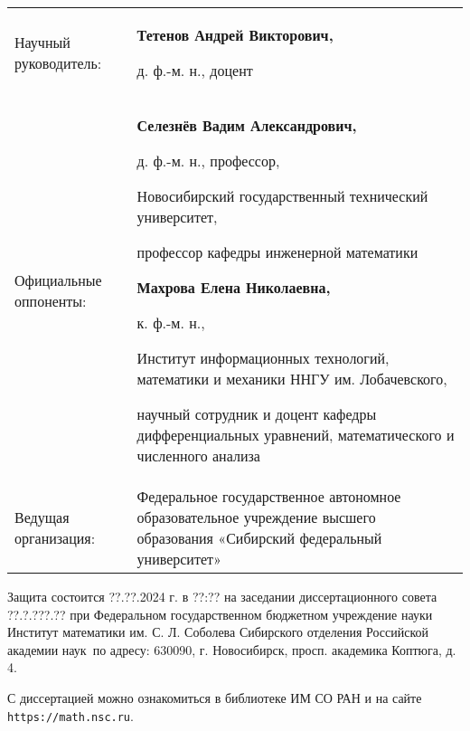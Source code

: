 \documentclass[a5paper,9pt,twoside]{extarticle} %
\begin{document}
\vspace{0.008\paperheight plus1fill}
\noindent%
\begin{tabular}{p{} p{}}
Научный руководитель: & \textbf{Тетенов Андрей Викторович,}\par
д. ф.-м. н., доцент

\vspace{0.013\paperheight}\\
Официальные оппоненты: &
{%
\textbf{Селезнёв Вадим Александрович,}\par
д. ф.-м. н., профессор,\par
Новосибирский государственный технический университет,\par
профессор кафедры инженерной математики\par
\vspace{0.01\paperheight}
\textbf{Махрова Елена Николаевна,}\par
к. ф.-м. н.,\par
Институт информационных технологий, математики и механики ННГУ им. Лобачевского,\par
научный сотрудник и доцент кафедры дифференциальных уравнений, математического и численного анализа

}%
\vspace{0.013\paperheight} \\
Ведущая организация: &
Федеральное государственное автономное образовательное учреждение высшего образования «Сибирский федеральный университет»
\end{tabular}
\vspace{0.008\paperheight plus1fill}

\noindent Защита состоится ??.??.2024 г. в ??:?? на заседании диссертационного совета ??.?.???.?? при Федеральном государственном бюджетном учреждение науки
Институт математики им. С. Л. Соболева Сибирского отделения Российской академии наук~по адресу: 630090, г. Новосибирск, просп. академика Коптюга, д. 4.

\vspace{0.008\paperheight plus1fill}
\noindent С диссертацией можно ознакомиться в библиотеке ИМ СО РАН и на сайте \texttt{https://math.nsc.ru}.

\end{document}
